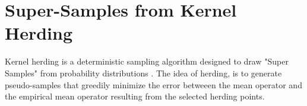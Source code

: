 \section{Super-Samples from Kernel Herding}
Kernel herding is a deterministic sampling algorithm designed to draw "Super Samples" from probability distributions \cite{supersamples}. The idea of herding, is to generate pseudo-samples that greedily minimize the error betweeen the mean operator and the empirical mean operator resulting from the selected herding points.


